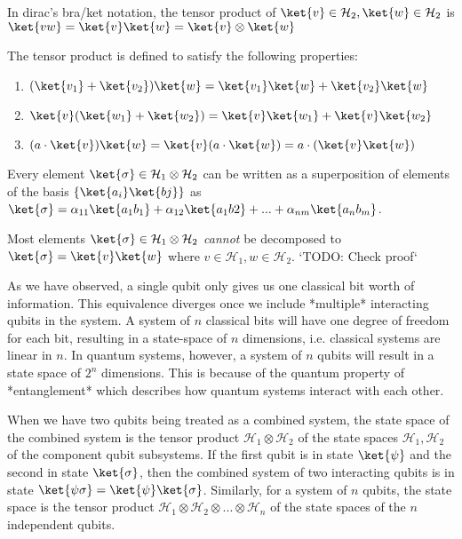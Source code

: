 \begin{notation}
    In dirac's bra/ket notation, the tensor product of $\ket{v} \in \mathcal{H}_2, \ket{w} \in \mathcal{H}_2$ is $\ket{vw} = \ket{v}\ket{w} = \ket{v} \otimes \ket{w}$
\end{notation}

The tensor product is defined to satisfy the following properties:
\begin{enumerate}
    \item $(\ket{v_1} + \ket{v_2} ) \ket{w} = \ket{v_1}\ket{w} + \ket{v_2}\ket{w}$
    \item $\ket{v}(\ket{w_1} + \ket{w_2}) =  \ket{v}\ket{w_1} + \ket{v}\ket{w_2}$
    \item $(a \cdot \ket{v})\ket{w} = \ket{v}(a \cdot \ket{w})  = a \cdot (\ket{v}\ket{w})$
\end{enumerate}
Every element $\ket{\sigma} \in \mathcal{H}_1 \otimes \mathcal{H}_2$ can be written as a superposition of elements of the basis $\{ \ket{a_i}\ket{bj} \}$ as $\ket{\sigma} = \alpha_{11} \ket{a_1 b_1} + \alpha_{12} \ket{a_1 b2} + ... + \alpha_{nm} \ket{a_n b_m}$.

Most elements $\ket{\sigma} \in \mathcal{H}_1 \otimes \mathcal{H}_2$ \textit{cannot} be decomposed to $\ket{\sigma} = \ket{v}\ket{w}$ where $v \in \mathcal{H}_1, w \in \mathcal{H}_2$.
`TODO: Check proof`

As we have observed, a single qubit only gives us one classical bit worth of information. This equivalence diverges once we include *multiple* interacting qubits in the system. A system of $n$ classical bits will have one degree of freedom for each bit, resulting in a state-space of $n$ dimensions, i.e. classical systems are linear in $n$. In quantum systems, however, a system of $n$ qubits will result in a state space of $2^n$ dimensions. This is because of the quantum property of *entanglement* which describes how quantum systems interact with each other.

\begin{lemma}
When we have two qubits being treated as a combined system, the state space of the combined system is the tensor product $\mathcal{H}_1 \otimes \mathcal{H}_2$ of the state spaces $\mathcal{H}_1, \mathcal{H}_2$ of the component qubit subsystems. If the first qubit is in state $\ket{\psi}$ and the second in state $\ket{\sigma}$, then the combined system of two interacting qubits is in state $\ket{\psi\sigma} = \ket{\psi}\ket{\sigma}$. Similarly, for a system of $n$ qubits, the state space is the tensor product $\mathcal{H}_1 \otimes \mathcal{H}_2 \otimes ... \otimes \mathcal{H}_n$ of the state spaces of the $n$ independent qubits.
\end{lemma}

